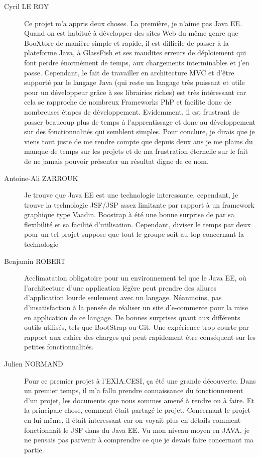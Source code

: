 \begin{description}
	\item[Cyril LE ROY]
	Ce projet m’a appris deux choses.
	La première, je n’aime pas Java EE. Quand on est habitué à développer des sites Web du même genre que BooXtore de manière simple et rapide, il est difficile de passer à la plateforme Java, à GlassFish et ses maudites erreurs de déploiement qui font perdre énormément de temps, aux chargements interminables et j’en passe.
	Cependant, le fait de travailler en architecture MVC et d’être supporté par le langage Java (qui reste un langage très puissant et utile pour un développeur grâce à ses librairies riches) est très intéressant car cela se rapproche de nombreux Frameworks PhP et facilite donc de nombreuses étapes de développement.
	Evidemment, il est frustrant de passer beaucoup plus de temps à l’apprentissage et donc au développement sur des fonctionnalités qui semblent simples.
	Pour conclure, je dirais que je viens tout juste de me rendre compte que depuis deux ans je me plains du manque de temps sur les projets et de ma frustration éternelle sur le fait de ne jamais pouvoir présenter un résultat digne de ce nom.
	\item[Antoine-Ali ZARROUK]
	Je trouve que Java EE est une technologie interessante, cependant, je trouve la technologie JSF/JSP assez limitante par rapport à un framework graphique type Vaadin.
	Boostrap à été une bonne surprise de par sa flexibilité et sa facilité d'utilisation.
	Cependant, diviser le temps par deux pour un tel projet suppose que tout le groupe soit au top concernant la technologie
	\item[Benjamin ROBERT]
	Acclimatation obligatoire pour un environnement tel que le Java EE, où l'architecture d'une application légère peut prendre des allures d'application lourde seulement avec un langage.
	Néanmoins, pas d'insatisfaction à la pensée de réaliser un site d'e-commerce pour la mise en application de ce langage. De bonnes surprises quant aux différents outils utilisés, tels que BootStrap ou Git. Une expérience trop courte par rapport aux cahier des charges qui peut rapidement être conséquent sur les petites fonctionnalités.
	\item[Julien NORMAND]
	Pour ce premier projet à l'EXIA.CESI, ça été une grande découverte. Dans un premier temps, il m'a fallu prendre connaissance du fonctionnement d'un projet, les documents que nous sommes amené à rendre ou à faire. Et la principale chose, comment était partagé le projet.
	Concernant le projet en lui même, il était interessant car on voyait plus en détails comment fonctionnait le JSF dans du Java EE. Vu mon niveau moyen en JAVA, je ne pensais pas parvenir à comprendre ce que je devais faire concernant ma partie.

\end{description}
